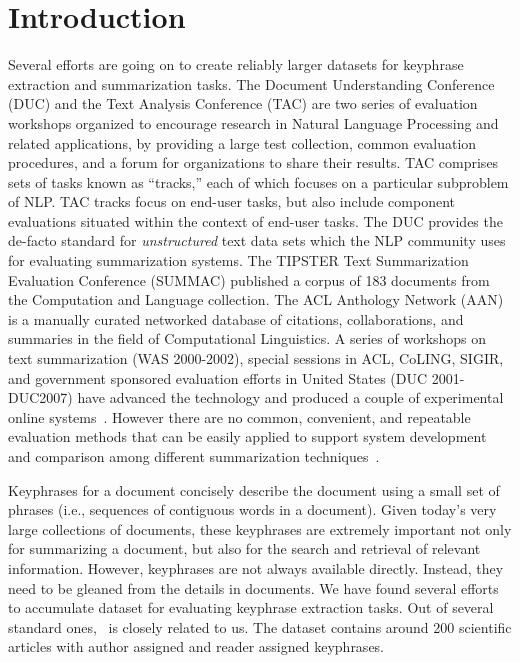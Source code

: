 \documentclass{sig-alternate-05-2015}
\begin{document}
\section{Introduction}
Several efforts are going on to create reliably larger datasets for keyphrase extraction and summarization tasks. The Document Understanding Conference (DUC) and the Text Analysis Conference (TAC) are two series of evaluation workshops organized to encourage research in Natural Language Processing and related applications, by providing a large test collection, common evaluation procedures, and a forum for organizations to share their results. TAC comprises sets of tasks known as ``tracks,'' each of which focuses on a particular subproblem of NLP. TAC tracks focus on end-user tasks, but also include component evaluations situated within the context of end-user tasks. The DUC provides the de-facto standard for \emph{unstructured} text data sets which the NLP community uses for evaluating summarization systems. The TIPSTER Text Summarization Evaluation Conference (SUMMAC) published a corpus of 183 documents from the Computation and Language collection.  The ACL Anthology Network (AAN) is a manually curated networked database of citations, collaborations, and summaries in the field of Computational Linguistics. %
A series of workshops on text summarization (WAS 2000-2002), special sessions in ACL, CoLING, SIGIR, and government sponsored evaluation efforts in United States (DUC 2001-DUC2007) have advanced the technology and produced a couple of experimental online systems~\cite{H01-1056}.  However there are no common, convenient, and repeatable evaluation methods that can be easily applied to support system development and comparison among different summarization techniques~\cite{Lin:2003:AES:1073445.1073465}.\\ 
\par Keyphrases for a document concisely describe the document using a small set of phrases (i.e., sequences of contiguous words in a document). Given today's very large collections of documents, these keyphrases are extremely important not only for summarizing a document, but also for the search and retrieval of relevant information. However, keyphrases are not always available directly. Instead, they need to be gleaned from the details in documents. We have found several efforts to accumulate dataset for evaluating keyphrase extraction tasks. Out of several standard ones,~\cite{Nguyen:2007} is closely related to us. The dataset contains around 200 scientific articles with author assigned and reader assigned keyphrases.\\ 
\end{document}
